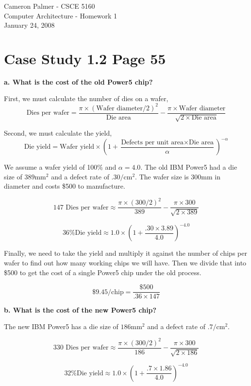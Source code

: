 \documentclass[12pt,twoside,letterpaper]{article}
\begin{document}
Cameron Palmer - CSCE 5160 \\
Computer Architecture - Homework 1 \\
January 24, 2008

\section*{Case Study 1.2 Page 55}
\textbf{a. What is the cost of the old Power5 chip?}

First, we must calculate the number of dies on a wafer,
\begin{equation}
\textrm{Dies per wafer} = \frac{\pi \times (\textrm{Wafer diameter}/2)^2}{\textrm{Die area}} - \frac{\pi \times \textrm{Wafer diameter}}{\sqrt{2 \times \textrm{Die area}}}
\end{equation}

Second, we must calculate the yield,
\begin{equation}
\textrm{Die yield} = \textrm{Wafer yield} \times \left( 1 + \frac{\textrm{Defects per unit area} \times \textrm{Die area}}{\alpha} \right)^{-\alpha}
\end{equation}

We assume a wafer yield of 100\% and $\alpha=4.0$. The old IBM Power5 had a die size of $389 \textrm{mm}^2$ and a defect rate of $.30/\textrm{cm}^2$. The wafer size is 300mm in diameter and costs \$500 to manufacture.

$$\textrm{147 Dies per wafer} \approx \frac{\pi \times (300/2)^2}{389} - \frac{\pi \times 300}{\sqrt{2 \times 389}}$$

$$\textrm{36\% Die yield} \approx 1.0 \times \left( 1 + \frac{.30 \times 3.89}{4.0} \right)^{-4.0}$$

Finally, we need to take the yield and multiply it against the number of chips per wafer to find out how many working chips we will have. Then we divide that into \$500 to get the cost of a single Power5 chip under the old process.

$$\textrm{\$9.45/chip} = \frac{\$500}{.36 \times 147}$$

\textbf{b. What is the cost of the new Power5 chip?}

The new IBM Power5 has a die size of $186 \textrm{mm}^2$ and a defect rate of $.7/\textrm{cm}^2$.

$$\textrm{330 Dies per wafer} \approx \frac{\pi \times (300/2)^2}{186} - \frac{\pi \times 300}{\sqrt{2 \times 186}}$$

$$\textrm{32\% Die yield} \approx 1.0 \times \left( 1 + \frac{.7 \times 1.86}{4.0} \right)^{-4.0}$$
\end{document}
